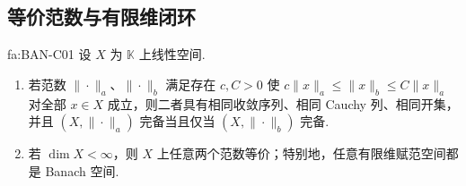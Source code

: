 \subsection{等价范数与有限维闭环}

\begin{FAProposition}[C][等价范数工具与有限维范数等价]{fa:BAN-C01}
设 \(\displaystyle X\) 为 \(\displaystyle \mathbb K\) 上线性空间.
\begin{enumerate}[label=\textup{(\roman*)}]
\item 若范数 \(\displaystyle \|\cdot\|_a\)、\(\displaystyle \|\cdot\|_b\) 满足存在 \(\displaystyle c,C>0\) 使 \(\displaystyle c\|x\|_a\leqslant\|x\|_b\leqslant C\|x\|_a\) 对全部 \(\displaystyle x\in X\) 成立，则二者具有相同收敛序列、相同 Cauchy 列、相同开集，并且 \(\displaystyle (X,\|\cdot\|_a)\) 完备当且仅当 \(\displaystyle (X,\|\cdot\|_b)\) 完备.
\item 若 \(\displaystyle \dim X<\infty\)，则 \(\displaystyle X\) 上任意两个范数等价；特别地，任意有限维赋范空间都是 Banach 空间.
\end{enumerate}
\end{FAProposition}


